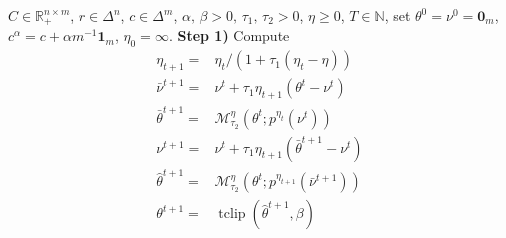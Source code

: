 \documentclass[10pt]{article}
\newcommand{\R}{\mathbb{R}}
\newcommand{\Rp}{\R_{+}}
\theoremstyle{plain}
\theoremstyle{definition}
\theoremstyle{remark}
\newcommand{\one}{\mathbf{1}}
\newcommand{\zero}{\mathbf{0}}
\begin{document}
\hfill
\begin{minipage}[t]{0.49\linewidth}
\begin{algorithm}[H]\caption{Log-Averaged Mirror Prox}\label{alg:lamp}
    \begin{algorithmic}
        \REQUIRE $C\in \Rp^{n\times m}$, $r\in\Delta^n$, $c\in\Delta^m$, $\alpha,\,\beta>0,\,\tau_1,\,\tau_2 > 0$,  $\eta \geq 0$,  $T\in\mathbb{N}$, set $\theta^0=\nu^0=\zero_m$, $c^\alpha=c + \alpha m^{-1}\one_m$, $\eta_0=\infty$.
            \STATE \textbf{Step 1)} Compute           
             \begin{align}
                \eta_{t+1}=&\eta_t/(1+\tau_1(\eta_t-\eta ))\label{step:eta_update}\\
                \bar{\nu}^{t+1}=&\nu^t+\tau_1\eta_{t+1}(\theta^t-\nu^t)\label{step:lamp_mid_nu}\\
                \bar\theta^{t+1}=&\mathcal{M}_{\tau_2}^{\eta }(\theta^{t};p^{\eta_t}(\nu^{t}))\label{step:lamp_mid_theta}\\
                {\nu}^{t+1}=&\nu^t+\tau_1\eta_{t+1}(\bar{\theta}^{t+1}-\nu^t)\label{step:lamp_main_nu}\\
            \hat\theta^{t+1}=&{\mathcal{M}}_{\tau_2}^{\eta }(\theta^{t};p^{\eta_{t+1}}(\bar\nu^{t+1}))\label{step:lamp_main_theta}\\
            \nonumber\theta^{t+1}=&\operatorname{tclip}(\hat\theta^{t+1},\beta)
            \end{align}
            

\end{algorithmic}
\end{algorithm}
\end{minipage}
\end{document}
